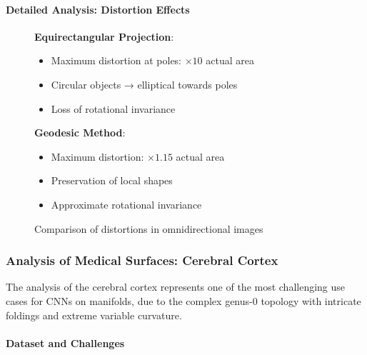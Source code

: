 \paragraph{Detailed Analysis: Distortion Effects}

\begin{figure}[h]
\centering
\begin{minipage}{0.45\textwidth}
\textbf{Equirectangular Projection}:
\begin{itemize}
    \item Maximum distortion at poles: $\times 10$ actual area
    \item Circular objects → elliptical towards poles
    \item Loss of rotational invariance
\end{itemize}
\end{minipage}
\hfill
\begin{minipage}{0.45\textwidth}
\textbf{Geodesic Method}:
\begin{itemize}
    \item Maximum distortion: $\times 1.15$ actual area
    \item Preservation of local shapes
    \item Approximate rotational invariance
\end{itemize}
\end{minipage}
\caption[Comparison of distortions in omnidirectional images]{Comparison of distortions in omnidirectional images}
\label{fig:omnidirectional_distortion}
\end{figure}

\subsubsection{Analysis of Medical Surfaces: Cerebral Cortex}\label{subsubsec:corteza_cerebral}

The analysis of the cerebral cortex represents one of the most challenging use cases for CNNs on manifolds, due to the complex genus-0 topology with intricate foldings and extreme variable curvature.

\paragraph{Dataset and Challenges}

